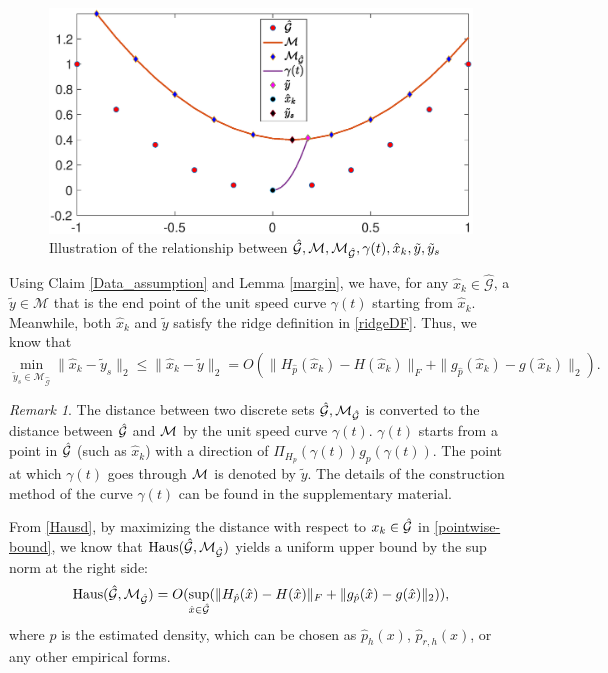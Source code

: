 \documentclass[aos,preprint]{imsart}
\theoremstyle{remark}
\newtheorem*{remark}{Remark}
\begin{document}
\begin{figure}[htbp] %
   \centering
   \includegraphics[width=0.8\linewidth]{demoMG.eps} 
   \caption{Illustration of the relationship  between $\hat{\cal G},{\cal M}, {\cal M}_{\cal \hat{G}}, \gamma(t),\hat{x}_k, \tilde{y}, \tilde{y}_s$}
   \label{fig:example:3}
\end{figure}


Using Claim \ref{Data_assumption} and Lemma \ref{margin}, we have, for any $\hat{x}_k\in \hat{\mathcal G}$, a $\tilde{y}\in {\mathcal M}$ that is the end point of the unit speed curve $\gamma(t)$ starting from $\hat{x}_k$. Meanwhile, both  $\hat{x}_k$ and $\tilde{y}$ satisfy the ridge definition in \eqref{ridgeDF}. 
Thus, we know that 
\begin{equation}\label{pointwise-bound}
\min_{\tilde{y}_s\in {\mathcal M}_{\hat{\mathcal G}}}\|\hat{x}_k-\tilde{y}_s\|_2 \leq \|\hat{x}_k-\tilde{y}\|_2 = O (\|H_{\hat{p}}(\hat{x}_k)-H(\hat{x}_k)\|_F+\|g_{\hat{p}}(\hat{x}_k)-g(\hat{x}_k)\|_2  ).
\end{equation}
\begin{remark}
The distance between two discrete sets $\hat{\cal G}, {\cal M}_{\hat{\cal G}}$ is converted to the distance between $\hat{\cal G}$ and ${\cal M}$ by the unit speed curve $\gamma(t)$. $\gamma(t)$ starts from a point in $\hat{\cal G}$ (such as $\hat{x}_k$) with a direction of $\Pi_{H_p}(\gamma(t)) g_{p}(\gamma(t))$. The point at which $\gamma(t)$ goes through $\cal M$ is denoted by $\tilde{y}$. The details of the construction method of the curve $\gamma(t)$ can be found in the supplementary material.
\end{remark}
From \eqref{Hausd}, by maximizing the distance with respect to $x_k\in 
\hat{\cal G}$ in \eqref{pointwise-bound}, we know that ${\rm Haus}({\mathcal {\hat{G}}}, {\mathcal M}_{\mathcal {\hat{G}}})$ yields a uniform upper bound by the sup norm at the right side:
\begin{equation}\label{Hausmargin}
{\rm Haus}({\hat{\mathcal G}}, {\mathcal M}_{\hat{\mathcal G}}) = O (\sup_{\hat{x}\in\hat{\cal G}}( \|H_{\hat{p}}(\hat{x})-H(\hat{x})\|_F+\|g_{\hat{p}}(\hat{x})-g(\hat{x})\|_2 ) ),
\end{equation}
where $\hat{p}$ is the estimated density, which can be chosen as $\hat{p}_h(x)$, $\hat{p}_{r,h}(x)$, or any other empirical forms.
\end{document}

